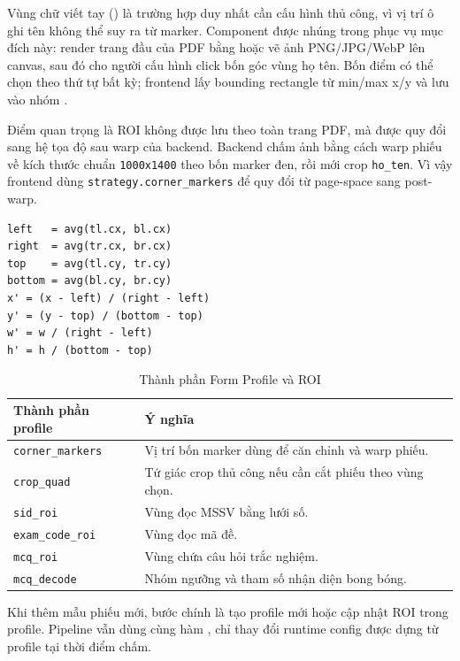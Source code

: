 Vùng chữ viết tay () là trường hợp duy nhất cần cấu hình thủ công, vì vị trí ô ghi tên không thể suy ra từ marker. Component  được nhúng trong  phục vụ mục đích này: render trang đầu của PDF bằng  hoặc vẽ ảnh PNG/JPG/WebP lên canvas, sau đó cho người cấu hình click bốn góc vùng họ tên. Bốn điểm có thể chọn theo thứ tự bất kỳ; frontend lấy bounding rectangle từ min/max x/y và lưu vào nhóm .

Điểm quan trọng là ROI không được lưu theo toàn trang PDF, mà được quy đổi sang hệ tọa độ sau warp của backend. Backend chấm ảnh bằng cách warp phiếu về kích thước chuẩn \texttt{1000x1400} theo bốn marker đen, rồi mới crop \texttt{ho\_ten}. Vì vậy frontend dùng \texttt{strategy.corner\_markers} để quy đổi từ page-space sang post-warp.

\begin{lstlisting}[caption={Công thức quy đổi ROI về hệ post-warp}, label={lst:roi_transform}, basicstyle=\ttfamily\small, breaklines=true, frame=single, showstringspaces=false]
left   = avg(tl.cx, bl.cx)
right  = avg(tr.cx, br.cx)
top    = avg(tl.cy, tr.cy)
bottom = avg(bl.cy, br.cy)
x' = (x - left) / (right - left)
y' = (y - top) / (bottom - top)
w' = w / (right - left)
h' = h / (bottom - top)
\end{lstlisting}

\begin{longtable}{|L{4.0cm}|L{10.0cm}|}
\caption{Thành phần Form Profile và ROI}
\label{tab:form-profile-roi}\\
\hline
\textbf{Thành phần profile} & \textbf{Ý nghĩa} \\
\hline
\texttt{corner\_markers} & Vị trí bốn marker dùng để căn chỉnh và warp phiếu. \\
\hline
\texttt{crop\_quad} & Tứ giác crop thủ công nếu cần cắt phiếu theo vùng chọn. \\
\hline
\texttt{sid\_roi} & Vùng đọc MSSV bằng lưới số. \\
\hline
\texttt{exam\_code\_roi} & Vùng đọc mã đề. \\
\hline
\texttt{mcq\_roi} & Vùng chứa câu hỏi trắc nghiệm. \\
\hline
\texttt{mcq\_decode} & Nhóm ngưỡng và tham số nhận diện bong bóng. \\
\hline
\end{longtable}

Khi thêm mẫu phiếu mới, bước chính là tạo profile mới hoặc cập nhật ROI trong profile. Pipeline vẫn dùng cùng hàm , chỉ thay đổi runtime config được dựng từ profile tại thời điểm chấm.

